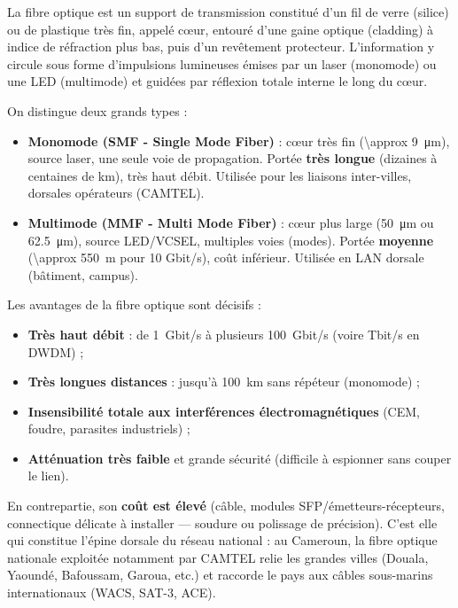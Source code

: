 \documentclass[11pt]{article}
\newcommand{\cle}[1]{{\popxbold\color{popdark}#1}}
\begin{document}
\begin{definition}
La \cle{fibre optique} est un support de transmission constitué d'un fil de verre (silice) ou de plastique très fin, appelé \cle{cœur}, entouré d'une \cle{gaine optique} (cladding) à indice de réfraction plus bas, puis d'un revêtement protecteur. L'information y circule sous forme d'\cle{impulsions lumineuses} émises par un laser (monomode) ou une LED (multimode) et guidées par réflexion totale interne le long du cœur.
\end{definition}

On distingue deux grands types :
\begin{itemize}
  \item \textbf{Monomode (SMF - Single Mode Fiber)} : cœur très fin (\SI{\approx 9}{\micro m}), source laser, une seule voie de propagation. Portée \textbf{très longue} (dizaines à centaines de km), très haut débit. Utilisée pour les liaisons inter-villes, dorsales opérateurs (CAMTEL).
  \item \textbf{Multimode (MMF - Multi Mode Fiber)} : cœur plus large (\SI{50}{\micro m} ou \SI{62.5}{\micro m}), source LED/VCSEL, multiples voies (modes). Portée \textbf{moyenne} (\SI{\approx 550}{m} pour 10 Gbit/s), coût inférieur. Utilisée en LAN dorsale (bâtiment, campus).
\end{itemize}

Les avantages de la fibre optique sont décisifs :

\begin{itemize}
  \item \textbf{Très haut débit} : de \SI{1}{Gbit/s} à plusieurs \SI{100}{Gbit/s} (voire Tbit/s en DWDM) ;
  \item \textbf{Très longues distances} : jusqu'à \SI{100}{km} sans répéteur (monomode) ;
  \item \textbf{Insensibilité totale aux interférences électromagnétiques} (CEM, foudre, parasites industriels) ;
  \item \textbf{Atténuation très faible} et grande sécurité (difficile à espionner sans couper le lien).
\end{itemize}

En contrepartie, son \textbf{coût est élevé} (câble, modules SFP/émetteurs-récepteurs, connectique délicate à installer — soudure ou polissage de précision). C'est elle qui constitue l'épine dorsale du réseau national : au Cameroun, la \cle{fibre optique nationale} exploitée notamment par CAMTEL relie les grandes villes (Douala, Yaoundé, Bafoussam, Garoua, etc.) et raccorde le pays aux câbles sous-marins internationaux (WACS, SAT-3, ACE).
\end{document}
